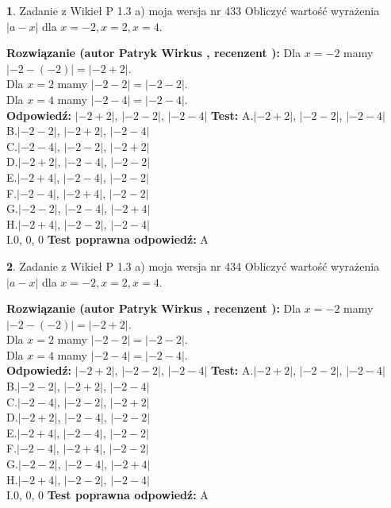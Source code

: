 \documentclass[12pt, a4paper]{article}
\theoremstyle{definition} %
\newtheorem{zad}{}
\newcommand{\zadStart}[1]{\begin{zad}#1\newline}
\newcommand{\zadStop}{\end{zad}}
\newcommand{\rozwStart}[2]{\noindent \textbf{Rozwiązanie (autor #1 , recenzent #2): }\newline}
\newcommand{\rozwStop}{\newline}
\newcommand{\odpStart}{\noindent \textbf{Odpowiedź:}\newline}
\newcommand{\odpStop}{\newline}
\newcommand{\testStart}{\noindent \textbf{Test:}\newline}
\newcommand{\testStop}{\newline}
\newcommand{\kluczStart}{\noindent \textbf{Test poprawna odpowiedź:}\newline}
\newcommand{\kluczStop}{\newline}
\begin{document}
\zadStart{Zadanie z Wikieł P 1.3 a) moja wersja nr 433}
Obliczyć wartość wyrażenia $|a - x|$ dla $x=-2,x=2,x=4$.
\zadStop
\rozwStart{Patryk Wirkus}{}
Dla $x = -2$ mamy $|-2 - (-2)| = |-2 + 2|$.\\
Dla $x = 2$ mamy $|-2 - 2| = |-2 - 2|$.\\
Dla $x = 4$ mamy $|-2 - 4| = |-2 - 4|$.\\
\rozwStop
\odpStart
$|-2 + 2|$, $|-2 - 2|$, $|-2 - 4|$
\odpStop
\testStart
A.$|-2 + 2|$, $|-2 - 2|$, $|-2 - 4|$\\
B.$|-2 - 2|$, $|-2 + 2|$, $|-2 - 4|$\\
C.$|-2 - 4|$, $|-2 - 2|$, $|-2 + 2|$\\
D.$|-2 + 2|$, $|-2 - 4|$, $|-2 - 2|$\\
E.$|-2 + 4|$, $|-2 - 4|$, $|-2 - 2|$\\
F.$|-2 - 4|$, $|-2 + 4|$, $|-2 - 2|$\\
G.$|-2 - 2|$, $|-2 - 4|$, $|-2 + 4|$\\
H.$|-2 + 4|$, $|-2 - 2|$, $|-2 - 4|$\\
I.$0$, $0$, $0$
\testStop
\kluczStart
A
\kluczStop



\zadStart{Zadanie z Wikieł P 1.3 a) moja wersja nr 434}
Obliczyć wartość wyrażenia $|a - x|$ dla $x=-2,x=2,x=4$.
\zadStop
\rozwStart{Patryk Wirkus}{}
Dla $x = -2$ mamy $|-2 - (-2)| = |-2 + 2|$.\\
Dla $x = 2$ mamy $|-2 - 2| = |-2 - 2|$.\\
Dla $x = 4$ mamy $|-2 - 4| = |-2 - 4|$.\\
\rozwStop
\odpStart
$|-2 + 2|$, $|-2 - 2|$, $|-2 - 4|$
\odpStop
\testStart
A.$|-2 + 2|$, $|-2 - 2|$, $|-2 - 4|$\\
B.$|-2 - 2|$, $|-2 + 2|$, $|-2 - 4|$\\
C.$|-2 - 4|$, $|-2 - 2|$, $|-2 + 2|$\\
D.$|-2 + 2|$, $|-2 - 4|$, $|-2 - 2|$\\
E.$|-2 + 4|$, $|-2 - 4|$, $|-2 - 2|$\\
F.$|-2 - 4|$, $|-2 + 4|$, $|-2 - 2|$\\
G.$|-2 - 2|$, $|-2 - 4|$, $|-2 + 4|$\\
H.$|-2 + 4|$, $|-2 - 2|$, $|-2 - 4|$\\
I.$0$, $0$, $0$
\testStop
\kluczStart
A
\kluczStop
\end{document}
